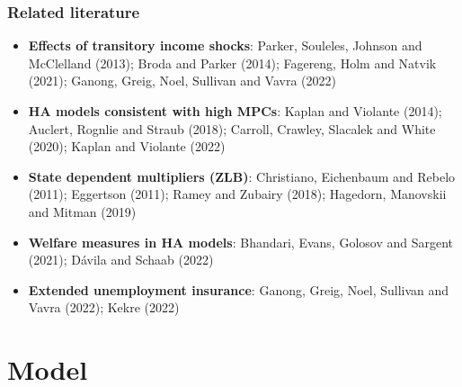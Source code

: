 \documentclass[pdflatex,aspectratio=169]{beamer}
\begin{document}
\begin{frame}
\frametitle{Related literature}
\small
\begin{itemize}
\item \textbf{Effects of transitory income shocks}: 
Parker, Souleles, Johnson and McClelland (2013); Broda and Parker (2014); Fagereng, Holm and Natvik (2021); Ganong, Greig, Noel, Sullivan and Vavra (2022)
\item \textbf{HA models consistent with high MPCs}: 
Kaplan and Violante (2014); Auclert, Rognlie and Straub (2018); Carroll, Crawley, Slacalek and White (2020); Kaplan and Violante (2022) 
\item \textbf{State dependent multipliers (ZLB)}: 
Christiano, Eichenbaum and Rebelo (2011); Eggertson (2011); Ramey and Zubairy (2018); Hagedorn, Manovskii and Mitman (2019) 
\item \textbf{Welfare measures in HA models}:
Bhandari, Evans, Golosov and Sargent (2021); D{\'a}vila and Schaab (2022)
\item \textbf{Extended unemployment insurance}:
Ganong, Greig, Noel, Sullivan and Vavra (2022); Kekre (2022) 
\end{itemize}
\normalsize
\end{frame}





\section{Model}
\end{document}
